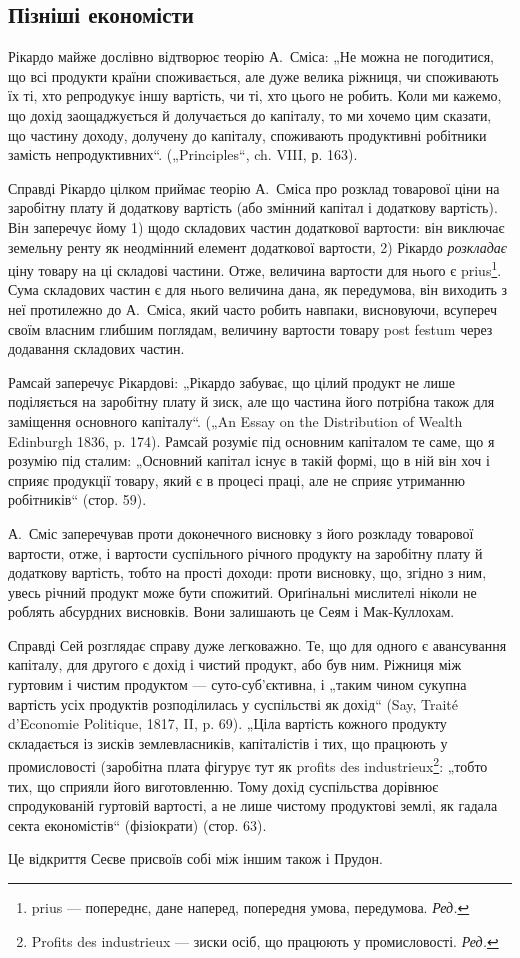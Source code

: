 \subsection[Пізніші економісти]{Пізніші економісти\footnotemark{}}


\label{original-299}
Рікардо
майже дослівно відтворює теорію А.~Сміса: „Не можна не
погодитися, що всі продукти країни споживається, але дуже велика ріжниця,
чи споживають їх ті, хто репродукує іншу вартість, чи ті, хто
цього не робить. Коли ми кажемо, що дохід заощаджується й долучається
до капіталу, то ми хочемо цим сказати, що частину доходу, долучену
до капіталу, споживають продуктивні робітники замість непродуктивних“.
(„Principles“, ch. VIII, р. 163).

Справді Рікардо цілком приймає теорію А.~Сміса про розклад товарової
ціни на заробітну плату й додаткову вартість (або змінний капітал
і додаткову вартість). Він заперечує йому 1) щодо складових частин
додаткової вартости: він виключає земельну ренту як неодмінний елемент
додаткової вартости, 2) Рікардо \emph{розкладає} ціну товару на ці складові
частини. Отже, величина вартости для нього є prius\footnote*{
prius — попереднє, дане наперед, попередня умова, передумова. \emph{Ред.}
}. Сума складових
частин є для нього величина дана, як передумова, він виходить з
неї протилежно до А.~Сміса, який часто робить навпаки, висновуючи,
всупереч своїм власним глибшим поглядам, величину вартости товару
post festum через додавання складових частин.

Рамсай заперечує Рікардові: „Рікардо забуває, що цілий продукт не
лише поділяється на заробітну плату й зиск, але що частина його потрібна
також для заміщення основного капіталу“. („An Essay on the Distribution
of Wealth Edinburgh 1836, p. 174). Рамсай розуміє під основним
капіталом те саме, що я розумію під сталим: „Основний капітал
існує в такій формі, що в ній він хоч і сприяє продукції товару, який є
в процесі праці, але не сприяє утриманню робітників“ (стор. 59).

А.~Сміс заперечував проти доконечного висновку з його розкладу
товарової вартости, отже, і вартости суспільного річного продукту на
заробітну плату й додаткову вартість, тобто на прості доходи: проти
висновку, що, згідно з ним, увесь річний продукт може бути спожитий.
Ориґінальні мислителі ніколи не роблять абсурдних висновків. Вони залишають
це Сеям і Мак-Куллохам.

Справді Сей розглядає справу дуже легковажно. Те, що для одного є
авансування капіталу, для другого є дохід і чистий продукт, або був ним.
Ріжниця між гуртовим і чистим продуктом — суто-суб’єктивна, і „таким чином
сукупна вартість усіх продуктів розподілилась у суспільстві як дохід“ (Say,
Traité d’Economie Politique, 1817, II, p. 69). „Ціла вартість кожного продукту
складається із зисків землевласників, капіталістів і тих, що працюють у
промисловості (заробітна плата фігурує тут як profits des industrieux\footnote*{
Profits des industrieux — зиски осіб, що працюють у промисловості. \emph{Ред.}
}:
„тобто тих, що сприяли його виготовленню. Тому дохід суспільства дорівнює
спродукованій   гуртовій   вартості, а не лише чистому
продуктові землі, як гадала секта економістів“ (фізіократи) (стор. 63).

Це відкриття Сеєве присвоїв собі між іншим також і Прудон.
